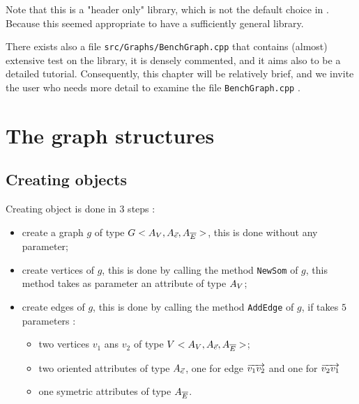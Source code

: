 Note that this is a "header only"  library, which is not the default choice in \PPP. Because this seemed
appropriate to have a sufficiently general library.

There exists also a file {\tt src/Graphs/BenchGraph.cpp} that contains (almost) extensive test on the library,
it is densely commented, and it aims also to be a detailed tutorial. Consequently, this chapter will be relatively
brief, and we invite the user who needs more detail to examine the file {\tt BenchGraph.cpp} .


\section{The graph structures}


\subsection{Creating objects}

Creating object is done in $3$ steps  :

\begin{itemize}
    \item  create a graph $g$ of type  $G<A_V,A_{\vec{e}},A_{\overline{E}}>$, this is done
           without any parameter;

    \item  create vertices  of $g$,  this is done by calling the method {\tt NewSom} of $g$,
          this method takes as parameter an attribute of type $A_V$;

    \item  create edges  of  $g$,  this is done by calling the method {\tt AddEdge} of $g$,
           if takes $5$  parameters :

    \begin{itemize}
          \item two vertices $v_1$ ans $v_2$  of type $V<A_V,A_{\vec{e}},A_{\overline{E}}>$;
          \item two oriented attributes of type $A_{\vec{e}}$, one for edge $\overrightarrow{v_1 v_2}$
                and one for  $\overrightarrow{v_2 v_1}$
          \item one symetric attributes of type $A_{\overline{E}}$.
    \end{itemize}
\end{itemize}

